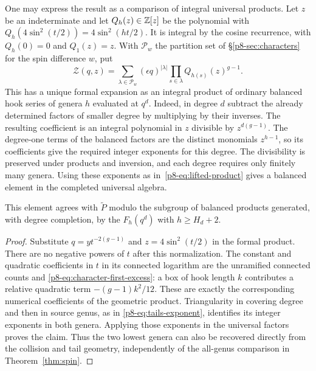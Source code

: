 One may express the result as a comparison of integral universal
products. Let $z$ be an indeterminate and let $Q_h(z)\in\mathbb Z[z]$ be the
polynomial with $Q_h(4\sin^2(t/2))=4\sin^2(ht/2)$. It is integral
by the cosine recurrence, with $Q_h(0)=0$ and $Q_1(z)=z$.
With $\mathcal P_w$ the partition set of \S\ref{p8-sec:characters} for the spin difference $w$, put
\[
 \mathcal Z(q,z)=\sum_{\lambda\in\mathcal P_w}
     (\epsilon q)^{|\lambda|}\prod_{s\in\lambda}Q_{h(s)}(z)^{g-1}.
\]
This has a unique formal expansion as an integral product of ordinary
balanced hook series of genera $h$ evaluated at $q^d$. Indeed, in
degree $d$ subtract the already determined factors of smaller degree
by multiplying by their inverses. The resulting coefficient is an
integral polynomial in $z$ divisible by $z^{d(g-1)}$. The degree-one
terms of the balanced factors are the distinct monomials $z^{h-1}$,
so its coefficients give the required integer exponents for this
degree. The divisibility is preserved under products and inversion,
and each degree requires only finitely many genera. Using these
exponents as in~\eqref{p8-eq:lifted-product} gives a balanced element
in the completed universal algebra.
\begin{corollary}\label{p8-cor:quotient}
This element agrees with $\widetilde P$ modulo the subgroup of
balanced products generated, with degree completion, by the
$F_h(q^d)$ with $h\ge H_d+2$.
\end{corollary}
\begin{proof}
Substitute $q=y t^{-2(g-1)}$ and $z=4\sin^2(t/2)$ in the formal
product. There are no negative powers of $t$ after this normalization.
The constant and quadratic coefficients in $t$ in its connected
logarithm are the unramified connected counts and
\eqref{p8-eq:character-first-excess}: a box of hook length $k$ contributes a
relative quadratic term $-(g-1)k^2/12$. These are exactly the
corresponding numerical coefficients of the geometric product.
Triangularity in covering degree and then in source genus, as in
\eqref{p8-eq:tails-exponent}, identifies its integer exponents in both
genera. Applying those exponents in the universal factors proves the
claim. Thus the two lowest genera can also be recovered directly from the collision and tail geometry, independently of the all-genus comparison in Theorem~\ref{thm:spin}.
\end{proof}
